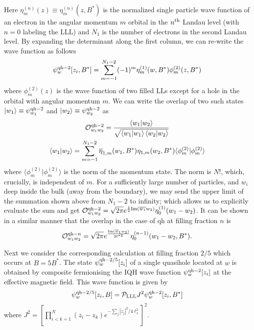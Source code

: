 \documentclass[twocolumn,floatfix,prb,aps,showpacs]{revtex4-2}
\newcommand{\IO}{\mathcal{O}}
\begin{document}
\begin{appendix}
Here $\eta^{(n)}_{m}(z)\equiv\eta^{(n)}_{m}(z,B^*)$ is the normalized single particle wave function of an electron in the angular momentum $m$ orbital in the $n^{\rm th}$ Landau level (with $n=0$ labeling the LLL) and $N_1$ is the number of electrons in the second Landau level. By expanding the determinant along the first column, we can re-write the wave function as follows
\begin{equation}
\psi^{{\rm qh}-2}_w[z_i,B^*]=\sum_{m=-1}^{N_1-2} (-1)^m \eta^{(1)}_{m}(w,B^*) \phi^{(2)}_m(z,B^*) 
\end{equation}
where $\phi^{(2)}_m(z)$ is the wave function of two filled LLs except for a hole in the orbital with angular momentum $m$.
We can write the overlap of two such states $\left | w_1 \right \rangle\equiv\psi^{{\rm qh}-2}_{w_1}$ and $\left | w_2 \right \rangle\equiv\psi^{{\rm qh}-2}_{w_2}$ as
\begin{gather}
\IO^{{\rm qh}-2}_{w_1w_2}=\frac{\left \langle w_1 | w_2\right \rangle}{\sqrt{\left \langle w_1 | w_1\right \rangle \left \langle w_2 | w_2\right \rangle}}\label{eq:ow1w2}\\
\left \langle w_1 | w_2\right \rangle=\sum_{m=-1}^{N_1-2} \overline{\eta}_{1,m}(w_1,B^*)\eta_{1,m}(w_2,B^*)  \langle \phi^{(2)}_m | \phi^{(2)}_m  \rangle \nonumber
\end{gather}
where $ \langle \phi^{(2)}_m | \phi^{(2)}_m  \rangle$ is the norm of the momentum state. The norm is $N!$, which, crucially, is independent of $m$. For a sufficiently large number of particles, and $w_i$ deep inside the bulk (away from the boundary),
we may send the upper limit of the summation shown above from $N_1-2$ to infinity; which allows us to explicitly evaluate the sum and get $\IO^{{\rm qh}-2}_{w_1w_2}=\sqrt{2\pi}e^{\frac{1}{2} {\rm Im}(\overline{w_1}w_2)} \eta^{(1)}_{0}(w_1-w_2)$. It can be shown in a similar manner that the overlap in the case of qh at filling fraction $n$ is 
\begin{equation}
\IO^{{\rm qh}-n}_{w_1w_2} =  \sqrt{2\pi}e^{\frac{{\rm Im}(\overline{w}_1w_2)}{2\ell^{*2}} } \eta^{(n-1)}_{0}(w_1-w_2,B^*).
\end{equation}

Next we consider the corresponding calculation at filling fraction $2/5$ which occurs at $B=5B^*$.  
The state $\psi^{{\rm qh}-2/5}_w[z_i]$ of a single quasihole located at $w$ is obtained by composite fermionising the IQH wave function $\psi^{{\rm qh}-2}_w[z_i]$ at the effective magnetic field. This wave function is given by 
\begin{equation}
\psi^{{\rm qh}-2/5}_w[z_i,B]=\mathcal{P}_{\rm LLL} J^2 \psi^{{\rm qh}-2}_{w}[z_i,B^*]
\end{equation}
where $J^2=\left[\prod_{i<k=1}^N(z_i-z_k) e^{-\sum_j|z_j|^2/4\ell_1^2}\right]^{2}$.


\end{appendix}
\end{document}
